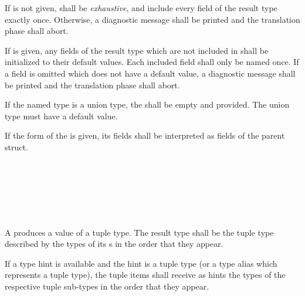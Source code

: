 \specsubsubitem
If  is not given,  shall be
\textit{exhaustive}, and include every field of the result type exactly once.
Otherwise, a diagnostic message shall be printed and the translation phase
shall abort.

\specsubsubitem
If  is given, any fields of the result type which are not
included in  shall be initialized to their default
values. Each included field shall only be named once. If a field is omitted
which does not have a default value, a diagnostic message shall be printed and
the translation phase shall abort.

\specsubsubitem
If the named type is a union type, the  shall be
empty and  provided. The union type must have a default value.

\specsubsubitem
If the  form of the  is
given, its fields shall be interpreted as fields of the parent struct.



\begin{grammar}
 \\
	\terminal{(}  \terminal{)} \\

 \\
	 \terminal{,}  \optional{\terminal{,}} \\
	 \terminal{,}  \\
\end{grammar}

\specsubsubitem
A  produces a value of a tuple type. The result type
shall be the tuple type described by the types of its s
in the order that they appear.

\specsubsubitem
If a type hint is available and the hint is a tuple type (or a type alias which
represents a tuple type), the tuple items shall receive as hints the types of
the respective tuple sub-types in the order that they appear.

